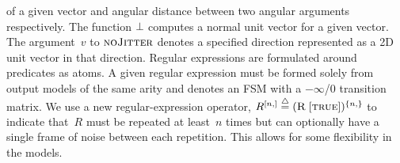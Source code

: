 of a given vector and angular distance between two angular arguments
respectively.
%
The function $\operatorname*{\perp\hspace*{-0.5pt}}$ computes a normal unit vector for a given vector.
%
The argument~$v$ to $\textsc{noJitter}$ denotes a specified direction
represented as a 2D unit vector in that direction.
%
Regular expressions are formulated around predicates as atoms.
%
A given regular expression must be formed solely from output models of the same
arity and denotes an FSM with a $-\infty$/0 transition matrix.
%
We use a new regular-expression operator,
$R^{[n,]}\stackrel{\triangle}{=}(\textsc{R}\;[\textsc{true}])^{\{n,\}}$ to indicate that~$R$
must be repeated at least~$n$ times but can optionally have a single frame of
noise between each repetition.
%
This allows for some flexibility in the models.

\begin{table}
  \centering
\end{table}
